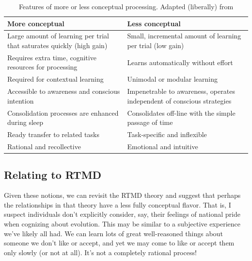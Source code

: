 \begin{table}
\begin{tabular}{p{}p{}}
\textbf{More conceptual} & \textbf{Less conceptual} \\ \hline \hline

Large amount of learning per trial that saturates quickly (high gain) &
Small, incremental amount of learning per trial (low gain) \\
\hline

Requires extra time, cognitive resources for processing &
Learns automatically without effort \\
\hline

Required for contextual learning &
Unimodal or modular learning \\
\hline

Accessible to awareness and conscious intention &
Impenetrable to awareness, operates independent of conscious strategies \\
\hline

Consolidation processes are enhanced during sleep &
Consolidates off-line with the simple passage of time \\
\hline

Ready transfer to related tasks &
Task-specific and inflexible \\
\hline

Rational and recollective &
Emotional and intuitive \\
\hline
\end{tabular}
\caption{Features of more or less conceptual processing. Adapted (liberally) from
\protect {}} 
\label{table:multiple}
\end{table}

\subsection{Relating to RTMD}

Given these notions, we can revisit the RTMD theory and suggest that perhaps the
relationships in that theory have a less fully conceptual flavor.  That is, I
suspect individuals don't explicitly consider, say, their feelings of national
pride when cognizing about evolution.  This may be similar to a subjective
experience we've likely all had. We can learn lots of great well-reasoned things
about someone we don't like or accept, and yet we may come to like or accept
them only slowly (or not at all). It's not a completely rational process!

